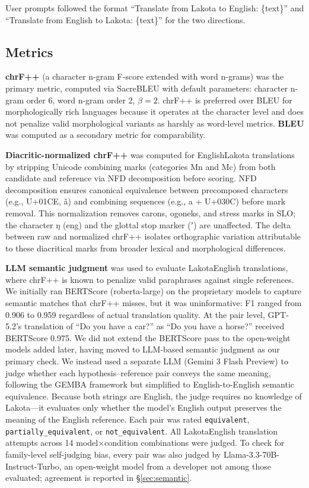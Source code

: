 \documentclass[11pt]{article}
\begin{document}
\noindent User prompts followed the format ``Translate from Lakota to English: \{text\}'' and ``Translate from English to Lakota: \{text\}'' for the two directions.

\subsection{Metrics}
\label{sec:metrics}

\textbf{chrF++} (a character n-gram F-score extended with word n-grams) was the primary metric, computed via SacreBLEU \cite{chrf,chrfpp} with default parameters: character n-gram order 6, word n-gram order 2, $\beta = 2$. chrF++ is preferred over BLEU for morphologically rich languages because it operates at the character level and does not penalize valid morphological variants as harshly as word-level metrics. \textbf{BLEU} was computed as a secondary metric for comparability.

\textbf{Diacritic-normalized chrF++} was computed for English\textrightarrow Lakota translations by stripping Unicode combining marks (categories Mn and Mc) from both candidate and reference via NFD decomposition before scoring. NFD decomposition ensures canonical equivalence between precomposed characters (e.g., U+01CE, ǎ) and combining sequences (e.g., a + U+030C) before mark removal. This normalization removes carons, ogoneks, and stress marks in SLO; the character ŋ (eng) and the glottal stop marker (ʼ) are unaffected. The delta between raw and normalized chrF++ isolates orthographic variation attributable to these diacritical marks from broader lexical and morphological differences.

\textbf{LLM semantic judgment} was used to evaluate Lakota\textrightarrow English translations, where chrF++ is known to penalize valid paraphrases against single references. We initially ran BERTScore \cite{bertscore} (roberta-large) on the proprietary models to capture semantic matches that chrF++ misses, but it was uninformative: F1 ranged from 0.906 to 0.959 regardless of actual translation quality. At the pair level, GPT-5.2's translation of ``Do you have a car?'' as ``Do you have a horse?'' received BERTScore 0.975. We did not extend the BERTScore pass to the open-weight models added later, having moved to LLM-based semantic judgment as our primary check. We instead used a separate LLM (Gemini 3 Flash Preview) to judge whether each hypothesis--reference pair conveys the same meaning, following the GEMBA framework \cite{gemba} but simplified to English-to-English semantic equivalence. Because both strings are English, the judge requires no knowledge of Lakota---it evaluates only whether the model's English output preserves the meaning of the English reference. Each pair was rated \texttt{equivalent}, \texttt{partially\_equivalent}, or \texttt{not\_equivalent}. All Lakota\textrightarrow English translation attempts across 14 model$\times$condition combinations were judged. To check for family-level self-judging bias, every pair was also judged by Llama-3.3-70B-Instruct-Turbo, an open-weight model from a developer not among those evaluated; agreement is reported in \S\ref{sec:semantic}.
\end{document}

